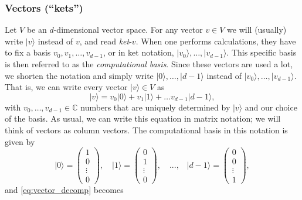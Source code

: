 \documentclass{article}
\theoremstyle{definition}
\newcommand{\ket}[1]{\vert #1 \rangle}
\begin{document}
\subsubsection{Vectors (``kets'')}
Let $V$ be an $d$-dimensional vector space. For any vector $v\in V$ we will (usually) write $\ket{v}$ instead of $v$, and read \emph{ket}-$v$. When one performs calculations, they have to fix a basis $v_0, v_1 , \dots, v_{d-1}$, or in ket notation, $\ket{v_0}, \dots , \ket{v_{d-1}}$. This specific basis is then referred to as the \emph{computational basis}.  Since these vectors are used a lot, we shorten the notation and simply write $\ket{0}, \dots, \ket{d-1}$ instead of $\ket{v_0}, \dots , \ket{v_{d-1}}$.  That is, we can write every vector $\ket{v}\in V$ as
\begin{equation}\label{eq:vector_decomp}
  \ket{v} = v_0 \ket{0} + v_1 \ket{1} +\dots v_{d-1} \ket{d-1},
\end{equation} 
with $v_0, \dots, v_{d-1}\in \mathbb{C}$ numbers that are uniquely determined by $\ket{v}$ and our choice of the basis. As usual, we can write this equation in matrix notation; we will think of vectors as column vectors. The computational basis in this notation is given by
\begin{equation*}
  \ket{0} = \begin{pmatrix} 1 \\ 0 \\ \vdots \\ 0 \end{pmatrix}, \quad 
  \ket{1} = \begin{pmatrix} 0 \\ 1 \\ \vdots \\ 0 \end{pmatrix}, \quad \text{...,} \quad
  \ket{d-1} = \begin{pmatrix} 0 \\ 0 \\ \vdots \\ 1 \end{pmatrix},
\end{equation*}
and \cref{eq:vector_decomp} becomes 
\end{document}

